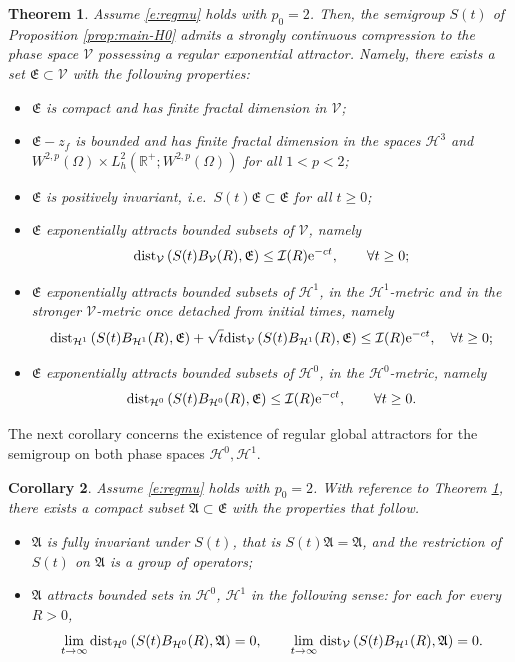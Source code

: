 \documentclass[12pt,leqno]{amsart}
\def\e{{\rm e}}
\def\dist{{\rm dist}}
\def\R {\mathbb{R}}
\newtheorem{theorem}{Theorem}[section]
\newtheorem{corollary}[theorem]{Corollary}
\theoremstyle{definition}
\numberwithin{equation}{section}
\numberwithin{figure}{section}
\begin{document}
\begin{theorem} \label{thm:main-exp-attractor-V}
Assume  \eqref{e:regmu} holds with $p_0=2$. Then, the semigroup $S(t)$ of Proposition \ref{prop:main-H0} admits a strongly continuous compression to the phase space $\mathcal V$ possessing a regular exponential attractor. Namely, there exists a set
$\mathfrak E\subset\mathcal V$  with the following properties:
\begin{itemize}
\item[\textup{(i)}] $\mathfrak E$ is compact and has finite fractal dimension in $\mathcal V$;
\item[\textup{(ii)}] $\mathfrak E -z_f$ is bounded  and has finite fractal dimension in the spaces  $\mathcal H^3$ and  $ W^{2,p}(\Omega)\times  L^{2}_{h}(\R^{+};W^{2,p}(\Omega))$ for all $1<p<2$;

\item[\textup{(iii)}]  $\mathfrak E$ is positively invariant, i.e.\ $S(t)\mathfrak E\subset \mathfrak E$ for all $t\ge0$;
\item[\textup{(iv)}] $\mathfrak E$ exponentially attracts bounded subsets of $\mathcal V$, namely\[
\dist_{\mathcal V}\left(S(t)B_{\mathcal V}(R),\mathfrak E\right)\le \mathcal I(R)\e^{-c t},
\qquad \forall t\ge0;
\]
\item[\textup{(v)}] $\mathfrak E$ exponentially attracts bounded subsets of $\mathcal H^1$, in the $\mathcal H^1$-metric and in the stronger $\mathcal V$-metric once  detached from initial times, namely
\[
\dist_{\mathcal H^1}\left(S(t)B_{\mathcal H^1}(R),\mathfrak E\right) + \sqrt{t}\dist_{\mathcal V}\left(S(t)B_{\mathcal H^1}(R),\mathfrak E\right)\le\mathcal I(R)\e^{-c t},
\quad \forall t\ge0;
\]
\item[\textup{(vi)}] $\mathfrak E$ exponentially attracts bounded subsets of $\mathcal H^0$, in the $\mathcal H^0$-metric, namely
\[
\dist_{\mathcal H^0}\left(S(t)B_{\mathcal H^0}(R),\mathfrak E\right) \leq  \mathcal I(R)\e^{-c t},
\qquad \forall t\ge0.
\]
\end{itemize}
\end{theorem}
The next corollary concerns the existence of regular global attractors for the semigroup on both phase spaces $\mathcal H^0, \mathcal H^1.$
\begin{corollary}\label{cor:main-global-attractors}
Assume \eqref{e:regmu} holds with $p_0=2$. With reference to \textup{Theorem \ref{thm:main-exp-attractor-V}}, there exists a compact subset  $\mathfrak A\subset \mathfrak E$ with the properties that follow.
\begin{itemize}
\item[\textup{(i)}] $\mathfrak A$ is fully invariant under $S(t)$, that is  $S(t)\mathfrak A=\mathfrak A$, and the restriction of $S(t)$ on $\mathfrak A$ is a group of operators;
\item[\textup{(ii)}] $\mathfrak A$ attracts bounded sets in $\mathcal H^0$, $\mathcal H^1$ in  the following sense: for each
for every $R>0$,
\[
\lim_{t\to \infty}
\dist_{\mathcal H^0}\left(S(t)B_{\mathcal H^0}(R),\mathfrak A\right)= 0, \qquad 
\lim_{t\to \infty}
\dist_{\mathcal V}\left(S(t)B_{\mathcal H^1}(R),\mathfrak A\right)= 0.
\]
\end{itemize}
\end{corollary}
\end{document}
